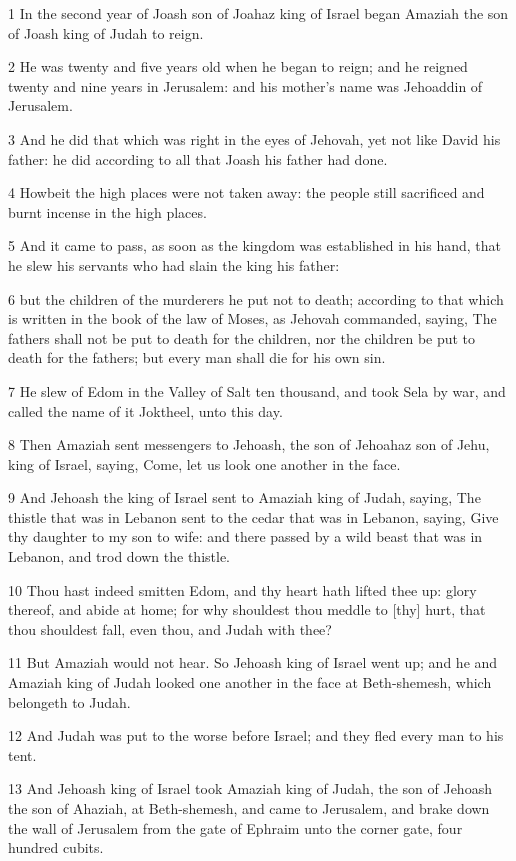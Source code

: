 \par 1 In the second year of Joash son of Joahaz king of Israel began Amaziah the son of Joash king of Judah to reign.
\par 2 He was twenty and five years old when he began to reign; and he reigned twenty and nine years in Jerusalem: and his mother's name was Jehoaddin of Jerusalem.
\par 3 And he did that which was right in the eyes of Jehovah, yet not like David his father: he did according to all that Joash his father had done.
\par 4 Howbeit the high places were not taken away: the people still sacrificed and burnt incense in the high places.
\par 5 And it came to pass, as soon as the kingdom was established in his hand, that he slew his servants who had slain the king his father:
\par 6 but the children of the murderers he put not to death; according to that which is written in the book of the law of Moses, as Jehovah commanded, saying, The fathers shall not be put to death for the children, nor the children be put to death for the fathers; but every man shall die for his own sin.
\par 7 He slew of Edom in the Valley of Salt ten thousand, and took Sela by war, and called the name of it Joktheel, unto this day.
\par 8 Then Amaziah sent messengers to Jehoash, the son of Jehoahaz son of Jehu, king of Israel, saying, Come, let us look one another in the face.
\par 9 And Jehoash the king of Israel sent to Amaziah king of Judah, saying, The thistle that was in Lebanon sent to the cedar that was in Lebanon, saying, Give thy daughter to my son to wife: and there passed by a wild beast that was in Lebanon, and trod down the thistle.
\par 10 Thou hast indeed smitten Edom, and thy heart hath lifted thee up: glory thereof, and abide at home; for why shouldest thou meddle to [thy] hurt, that thou shouldest fall, even thou, and Judah with thee?
\par 11 But Amaziah would not hear. So Jehoash king of Israel went up; and he and Amaziah king of Judah looked one another in the face at Beth-shemesh, which belongeth to Judah.
\par 12 And Judah was put to the worse before Israel; and they fled every man to his tent.
\par 13 And Jehoash king of Israel took Amaziah king of Judah, the son of Jehoash the son of Ahaziah, at Beth-shemesh, and came to Jerusalem, and brake down the wall of Jerusalem from the gate of Ephraim unto the corner gate, four hundred cubits.
